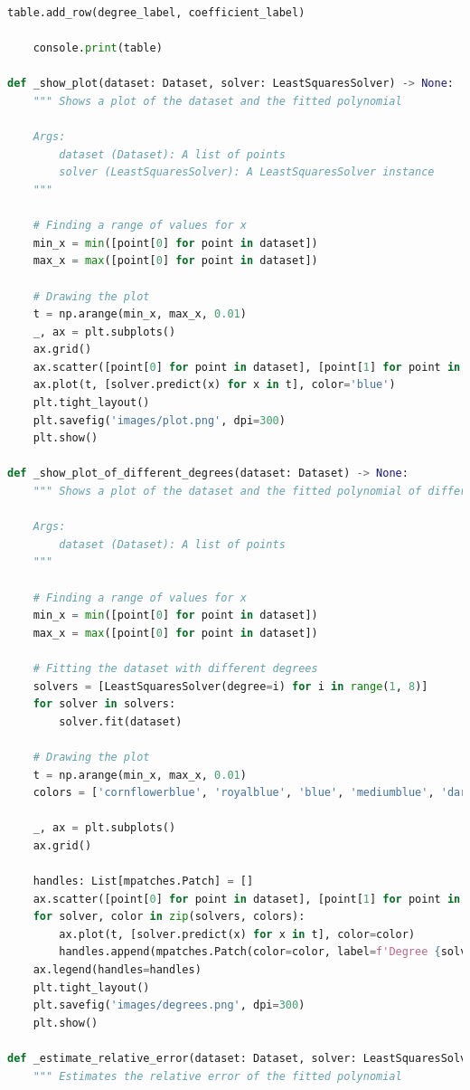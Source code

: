 \documentclass[12pt]{extarticle}
\begin{document}
\begin{lstlisting}[language=Python, caption=Запуск методу найближчих квадратів]
        table.add_row(degree_label, coefficient_label)
    
    console.print(table)

def _show_plot(dataset: Dataset, solver: LeastSquaresSolver) -> None:
    """ Shows a plot of the dataset and the fitted polynomial
    
    Args:
        dataset (Dataset): A list of points
        solver (LeastSquaresSolver): A LeastSquaresSolver instance
    """
    
    # Finding a range of values for x
    min_x = min([point[0] for point in dataset])
    max_x = max([point[0] for point in dataset])
    
    # Drawing the plot
    t = np.arange(min_x, max_x, 0.01)
    _, ax = plt.subplots()
    ax.grid()
    ax.scatter([point[0] for point in dataset], [point[1] for point in dataset], marker='x', color='red')
    ax.plot(t, [solver.predict(x) for x in t], color='blue')
    plt.tight_layout()
    plt.savefig('images/plot.png', dpi=300)
    plt.show()
    
def _show_plot_of_different_degrees(dataset: Dataset) -> None:
    """ Shows a plot of the dataset and the fitted polynomial of different degrees
    
    Args:
        dataset (Dataset): A list of points
    """
    
    # Finding a range of values for x
    min_x = min([point[0] for point in dataset])
    max_x = max([point[0] for point in dataset])
    
    # Fitting the dataset with different degrees
    solvers = [LeastSquaresSolver(degree=i) for i in range(1, 8)]
    for solver in solvers:
        solver.fit(dataset)
    
    # Drawing the plot
    t = np.arange(min_x, max_x, 0.01)
    colors = ['cornflowerblue', 'royalblue', 'blue', 'mediumblue', 'darkblue', 'navy', 'midnightblue']
    
    _, ax = plt.subplots()
    ax.grid()
    
    handles: List[mpatches.Patch] = []
    ax.scatter([point[0] for point in dataset], [point[1] for point in dataset], marker='x', color='red')
    for solver, color in zip(solvers, colors):
        ax.plot(t, [solver.predict(x) for x in t], color=color)
        handles.append(mpatches.Patch(color=color, label=f'Degree {solver._degree}'))
    ax.legend(handles=handles)
    plt.tight_layout()
    plt.savefig('images/degrees.png', dpi=300)
    plt.show()

def _estimate_relative_error(dataset: Dataset, solver: LeastSquaresSolver) -> np.floating:
    """ Estimates the relative error of the fitted polynomial


\end{lstlisting}
\end{document}
